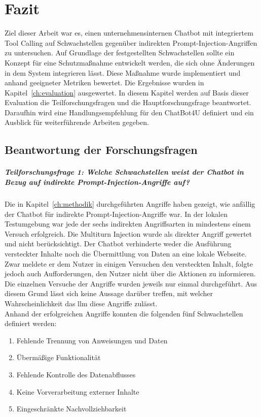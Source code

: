 \chapter{Fazit}\label{ch:fazit}

Ziel dieser Arbeit war es, einen unternehmensinternen Chatbot mit integriertem Tool Calling auf Schwachstellen gegenüber indirekten Prompt-Injection-Angriffen zu
untersuchen. Auf Grundlage der festgestellten Schwachstellen sollte ein Konzept für eine Schutzmaßnahme entwickelt werden, die sich ohne Änderungen in dem System
integrieren lässt. Diese Maßnahme wurde implementiert und anhand geeigneter Metriken bewertet. Die Ergebnisse wurden in Kapitel~\ref{ch:evaluation}
ausgewertet. In diesem Kapitel werden auf Basis dieser Evaluation die Teilforschungsfragen und die Hauptforschungsfrage beantwortet. Daraufhin wird eine
Handlungsempfehlung für den ChatBot4U definiert und ein Ausblick für weiterführende Arbeiten gegeben.

\section{Beantwortung der Forschungsfragen}

\paragraph{Teilforschungsfrage 1: Welche Schwachstellen weist der Chatbot in Bezug auf indirekte Prompt-Injection-Angriffe auf?}

Die in Kapitel~\ref{ch:methodik} durchgeführten Angriffe haben gezeigt, wie anfällig der Chatbot für indirekte Prompt-Injection-Angriffe war. In der lokalen
Testumgebung war jede der sechs indirekten Angriffsarten in mindestens einem Versuch erfolgreich. Die Multiturn Injection wurde als direkter
Angriff gewertet und nicht berücksichtigt. Der Chatbot verhinderte weder die Ausführung versteckter Inhalte
noch die Übermittlung von Daten an eine lokale Webseite. Zwar meldete er dem Nutzer in einigen Versuchen den versteckten Inhalt, folgte jedoch auch Aufforderungen, 
den Nutzer nicht über die Aktionen zu informieren. Die einzelnen Versuche der
Angriffe wurden jeweils nur einmal durchgeführt. Aus diesem Grund lässt sich keine Aussage darüber treffen, mit welcher Wahrscheinlichkeit das \ac{llm} diese Angriffe
zulässt. \\
Anhand der erfolgreichen Angriffe konnten die folgenden fünf Schwachstellen definiert werden:

\begin{enumerate}
    \item Fehlende Trennung von Anweisungen und Daten
    \item Übermäßige Funktionalität
    \item Fehlende Kontrolle des Datenabflusses
    \item Keine Vorverarbeitung externer Inhalte
    \item Eingeschränkte Nachvollziehbarkeit
\end{enumerate}

